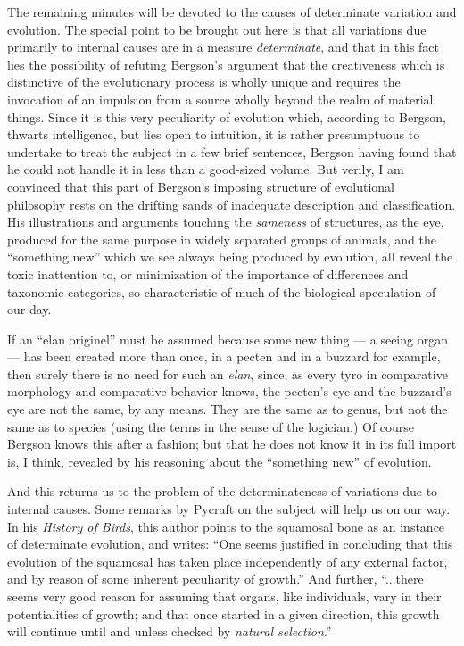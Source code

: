 \documentclass[a4paper, 11pt, oneside, polutonikogreek, english, landscape]{article}
\begin{document}
The remaining minutes will be devoted to the causes of determinate variation and evolution. The special point to be brought out here is that all variations due primarily to internal causes are in a measure \emph{determinate}, and that in this fact lies the possibility of refuting Bergson's argument that the creativeness which is distinctive of the evolutionary process is wholly unique and requires the invocation of an impulsion from a source wholly beyond the realm of material things. Since it is this very peculiarity of evolution which, according to Bergson, thwarts intelligence, but lies open to intuition, it is rather presumptuous to undertake to treat the subject in a few brief sentences, Bergson having found that he could not handle it in less than a good-sized volume. But verily, I am convinced that this part of Bergson's imposing structure of evolutional philosophy rests on the drifting sands of inadequate description and classification. His illustrations and arguments touching the \emph{sameness} of structures, as the eye, produced for the same purpose in widely separated groups of animals, and the ``something new'' which we see always being produced by evolution, all reveal the toxic inattention to, or minimization of the importance of differences and taxonomic categories, so characteristic of much of the biological speculation of our day.

If an ``elan originel'' must be assumed because some new thing --- a seeing organ --- has been created more than once, in a pecten and in a buzzard for example, then surely there is no need for such an \emph{elan}, since, as every tyro in comparative morphology and comparative behavior knows, the pecten's eye and the buzzard's eye are not the same, by any means. They are the same as to genus, but not the same as to species (using the terms in the sense of the logician.) Of course Bergson knows this after a fashion; but that he does not know it in its full import is, I think, revealed by his reasoning about the ``something new'' of evolution.

And this returns us to the problem of the determinateness of variations due to internal causes. Some remarks by Pycraft on the subject will help us on our way. In his \emph{History of Birds}, this author points to the squamosal bone as an instance of determinate evolution, and writes: ``One seems justified in concluding that this evolution of the squamosal has taken place independently of any external factor, and by reason of some inherent peculiarity of growth.'' And further, ``...there seems very good reason for assuming that organs, like individuals, vary in their potentialities of growth; and that once started in a given direction, this growth will continue until and unless checked by \emph{natural selection}.''
\end{document}

